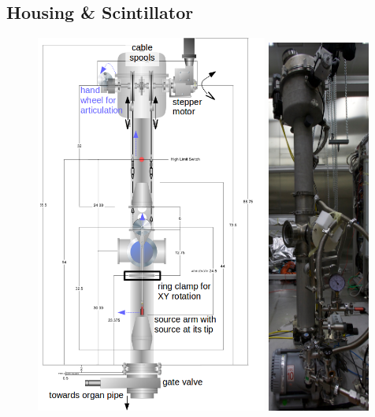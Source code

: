 \subsection{Housing \& Scintillator}
\begin{figure}[htbp]
 \centering
 \includegraphics[width=0.68\textwidth]{Figures/CALISDimensions.png}
 \includegraphics[width=0.30\textwidth]{Figures/CALIS_overview_IMG_3763.jpg}

\end{figure}
